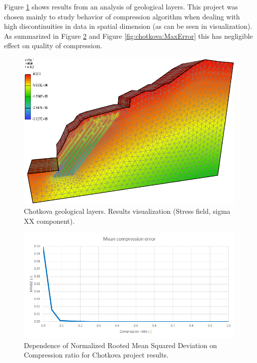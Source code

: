 Figure \ref{fig:chotkova:mesh} shows results from an analysis of geological layers. This project was chosen mainly to study behavior of compression algorithm when dealing with high discontinuities in data in spatial dimension (as can be seen in visualization). As summarized in Figure \ref{fig:chotkova:NRMSD} and Figure \ref{fig:chotkova:MaxError} this has negligible effect on quality of compression.

\begin{figure}[H]
\centering\includegraphics[width=\textwidth]{figures/chotkova_screenshot}
\caption{Chotkova geological layers. Results visualization (Stress field, sigma XX component).}
\label{fig:chotkova:mesh}
\end{figure}

\begin{figure}[H]
\centering\includegraphics[width=\textwidth]{figures/chotkova_NRMSD}
\caption{Dependence of Normalized Rooted Mean Squared Deviation on Compression ratio for Chotkova project results.}
\label{fig:chotkova:NRMSD}
\end{figure}

